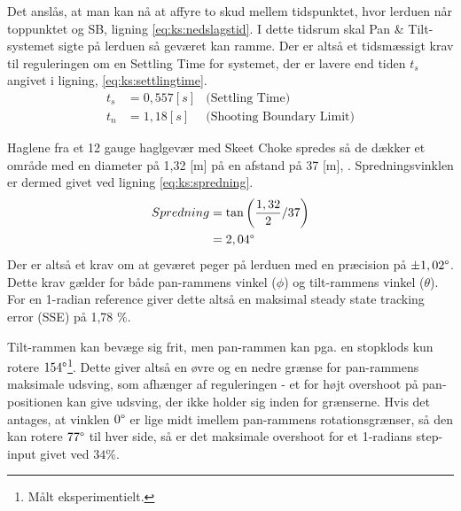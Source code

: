 Det anslås, at man kan nå at affyre to skud mellem tidspunktet,
hvor lerduen når toppunktet og SB, ligning \ref{eq:ks:nedslagstid}.
I dette tidsrum skal Pan \& Tilt-systemet sigte på lerduen så geværet kan ramme.
Der er altså et tidsmæssigt krav til reguleringen om en Settling Time for systemet,
der er lavere end tiden \(t_{s}\) angivet i ligning, \ref{eq:ks:settlingtime}.
\begin{align}
  t_{s} &= 0,557 [s] &\text{(Settling Time)}
  \label{eq:ks:settlingtime}
\\
  t_{n} &= 1,18 [s] &\text{(Shooting Boundary Limit)}
  \label{eq:ks:nedslagstid}
\end{align}

Haglene fra et 12 gauge haglgevær med Skeet Choke spredes så de dækker et område
med en diameter på 1,32 [m] på en afstand på 37 [m], \citep[Pattern and choke]{patternandchoke}.
Spredningsvinklen er dermed givet ved ligning \ref{eq:ks:spredning}.
\begin{align}
  Spredning &= \tan \left(\frac{1,32}{2} / 37 \right) \\
  &= 2,04 \degree
  \label{eq:ks:spredning}
\end{align}
Der er altså et krav om at geværet peger på lerduen med en præcision på \(\pm 1,02 \degree\).
Dette krav gælder for både pan-rammens vinkel (\(\phi\)) og tilt-rammens vinkel (\(\theta\)).
For en 1-radian reference giver dette altså en maksimal steady state tracking error (SSE) på 1,78 \%.

Tilt-rammen kan bevæge sig frit,
men pan-rammen kan pga. en stopklods kun rotere \(154 \degree\)\footnote{Målt eksperimentielt.}.
Dette giver altså en øvre og en nedre grænse for pan-rammens maksimale udsving,
som afhænger af reguleringen
- et for højt overshoot på pan-positionen kan give udsving, der ikke holder sig inden for grænserne.
Hvis det antages, at vinklen \(0 \degree\) er lige midt imellem pan-rammens rotationsgrænser,
så den kan rotere \(77 \degree\) til hver side, så er det maksimale overshoot for et 1-radians step-input
givet ved \(34 \%\).